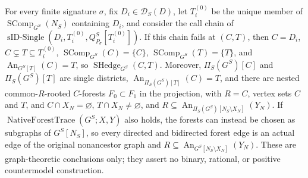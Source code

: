 For every finite signature \(\sigma\), fix \(D_i\in\mathcal D_S(D)\), let \(T_i^{(0)}\) be the unique member of \(\operatorname{SComp}_{G^S}(N_S)\) containing \(D_i\), and consider the call chain of \(\operatorname{sID\text{-}Single}(D_i,T_i^{(0)},Q_{P_\sigma}^S[T_i^{(0)}])\). If this chain fails at \((C,T)\), then \(C=D_i\), \(C\subsetneq T\subseteq T_i^{(0)}\), \(\operatorname{SComp}_{G^S}(C)=\{C\}\), \(\operatorname{SComp}_{G^S}(T)=\{T\}\), and \(\operatorname{An}_{G^S[T]}(C)=T\), so \(\operatorname{SHedge}_{G^S}(C,T)\). Moreover, \(\Pi_S(G^S)[C]\) and \(\Pi_S(G^S)[T]\) are single districts, \(\operatorname{An}_{\Pi_S(G^S)[T]}(C)=T\), and there are nested common-\(R\)-rooted \(C\)-forests \(F_0\subset F_1\) in the projection, with \(R=C\), vertex sets \(C\) and \(T\), and \(C\cap X_N=\varnothing\), \(T\cap X_N\ne\varnothing\), and \(R\subseteq\operatorname{An}_{\Pi_S(G^S)[N_S\setminus X_N]}(Y_N)\). If \(\operatorname{NativeForestTrace}(G^S;X,Y)\) also holds, the forests can instead be chosen as subgraphs of \(G^S[N_S]\), so every directed and bidirected forest edge is an actual edge of the original nonancestor graph and \(R\subseteq\operatorname{An}_{G^S[N_S\setminus X_N]}(Y_N)\). These are graph-theoretic conclusions only; they assert no binary, rational, or positive countermodel construction.